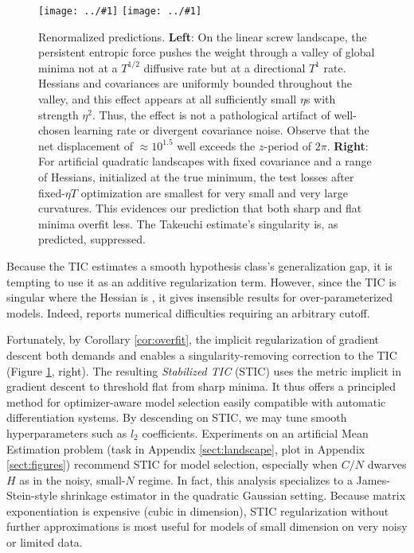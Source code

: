 \documentclass{article}
\theoremstyle{plain}
\theoremstyle{definition}
\newcommand{\plotmoow}[3]{\texttt{[image: ../\#1]}}
\begin{document}
        \begin{figure}[h!] 
            \centering
            \plotmoow{plots/new-thermo-linear-screw}{0.48\columnwidth}{4.0cm}
            \plotmoow{plots/new-tak}{0.48\columnwidth}{4.0cm}
            \caption{
                Renormalized predictions.
                {\bf Left}: On the linear screw landscape, the persistent
                entropic force pushes the weight through a valley of global
                minima not at a $T^{1/2}$ diffusive rate but at a directional
                $T^1$ rate.  Hessians and covariances  are uniformly bounded
                throughout the valley, and this effect appears at all
                sufficiently small $\eta$s with strength $\eta^2$.  Thus, the
                effect is not a pathological artifact of well-chosen learning
                rate or divergent covariance noise.  Observe that the net
                displacement of $\approx 10^{1.5}$ well exceeds the $z$-period
                of $2\pi$. 
                {\bf Right}: For artificial quadratic landscapes with fixed
                covariance and a range of Hessians, initialized at the true
                minimum, the test losses after fixed-$\eta T$ optimization are
                smallest for very small and very large curvatures.  This
                evidences our prediction that both sharp and flat minima
                overfit less.  The Takeuchi estimate's singularity is, as
                predicted, suppressed.
            }
            \label{fig:thermoandtak}
        \end{figure}

        Because the TIC estimates a smooth hypothesis class's generalization
        gap, it is tempting to use it as an additive regularization term.
        However, since the TIC is singular where the Hessian is , it gives insensible results for over-parameterized
        models.  Indeed, \citet{di18} reports numerical difficulties
        requiring an arbitrary cutoff. 

        Fortunately, by Corollary \ref{cor:overfit}, the implicit
        regularization of gradient descent both demands and enables a
        singularity-removing correction to the TIC (Figure
        \ref{fig:thermoandtak}, right).  The resulting \emph{Stabilized TIC}
        (STIC) uses the metric implicit in gradient descent to threshold flat
        from sharp minima.  It thus offers a principled method for
        optimizer-aware model selection easily compatible with automatic
        differentiation systems.  By descending on STIC, we may tune smooth
        hyperparameters such as $l_2$ coefficients.  Experiments on an
        artificial Mean Estimation problem (task in Appendix
        \ref{sect:landscape}, plot in Appendix \ref{sect:figures}) recommend
        STIC for model selection, especially when $C/N$ dwarves $H$ as in the
        noisy, small-$N$ regime.  In fact, this analysis specializes to 
        a James-Stein-style shrinkage estimator in the quadratic Gaussian
        setting.  Because matrix
        exponentiation is expensive
        (cubic in dimension), STIC regularization without further
        approximations is most useful for models of small dimension on very
        noisy or limited data.
\end{document}
